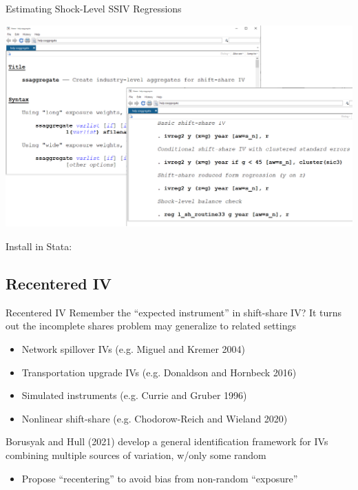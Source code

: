 \documentclass{beamer}
\begin{document}
\begin{frame}{Estimating Shock-Level SSIV Regressions}
\vspace{-0.3cm}
\begin{center}
\includegraphics[scale=0.27]{./lecture_includes/ssaggregate.png}
\end{center}
Install in Stata: 
\end{frame}

\subsection{Recentered IV}
\begin{frame}{Recentered IV}
Remember the ``expected instrument'' in shift-share IV? It turns out the incomplete shares problem may generalize to related settings\smallskip
\begin{itemize}
\item Network spillover IVs (e.g. Miguel and Kremer 2004)\smallskip
\item Transportation upgrade IVs (e.g. Donaldson and Hornbeck 2016)\smallskip
\item Simulated instruments (e.g. Currie and Gruber 1996)\smallskip
\item Nonlinear shift-share (e.g. Chodorow-Reich and Wieland 2020)
\end{itemize}\bigskip\pause{}

Borusyak and Hull (2021) develop a general identification framework for IVs combining multiple sources of variation, w/only some random\smallskip
\begin{itemize}
\item Propose ``recentering'' to avoid bias from non-random ``exposure''
\end{itemize}
\end{frame}
\end{document}

